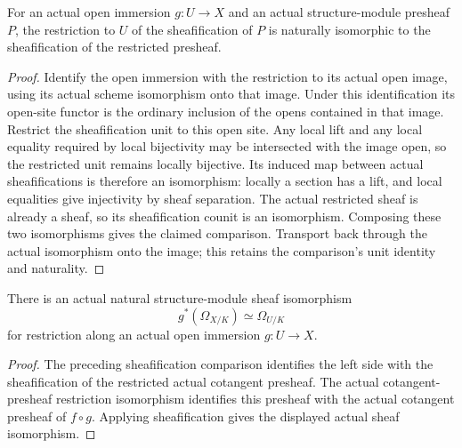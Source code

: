 \begin{theorem}
\label{sc0-canonical-port:geom:sheafification-open-immersion-restriction}
\leanok
For an actual open immersion \(g:U\to X\) and an actual
structure-module presheaf \(P\), the restriction to \(U\)
of the sheafification of \(P\) is naturally isomorphic
to the sheafification of the restricted presheaf.
\end{theorem}
\begin{proof}
Identify the open immersion with the restriction to its actual
open image, using its actual scheme isomorphism onto that image.
Under this identification its open-site functor is the ordinary
inclusion of the opens contained in that image. Restrict the
sheafification unit to this open site. Any local lift and any
local equality required by local bijectivity may be intersected
with the image open, so the restricted unit remains locally
bijective. Its induced map between actual sheafifications is
therefore an isomorphism: locally a section has a lift, and
local equalities give injectivity by sheaf separation.
The actual restricted sheaf is already a sheaf, so its
sheafification counit is an isomorphism. Composing these two
isomorphisms gives the claimed comparison. Transport back
through the actual isomorphism onto the image; this retains
the comparison's unit identity and naturality.
\end{proof}

\begin{theorem}
\label{sc0-canonical-port:geom:cotangent-sheaf-open-immersion-restriction}
\leanok
There is an actual natural structure-module sheaf isomorphism
\[
 g^*(\Omega_{X/K})\simeq\Omega_{U/K}
\]
for restriction along an actual open immersion \(g:U\to X\).
\end{theorem}
\begin{proof}
The preceding sheafification comparison identifies the left
side with the sheafification of the restricted actual cotangent
presheaf. The actual cotangent-presheaf restriction isomorphism
identifies this presheaf with the actual cotangent presheaf of
\(f\circ g\). Applying sheafification gives the displayed
actual sheaf isomorphism.
\end{proof}

